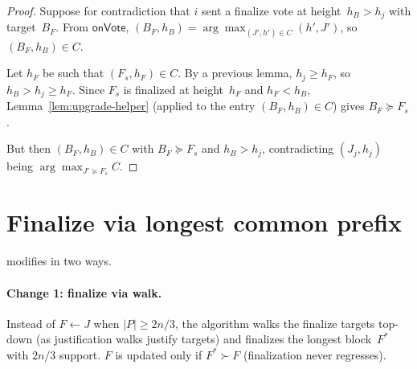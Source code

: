 \ifx\litemode\undefined\documentclass{article}\fi
\theoremstyle{plain}
\newtheorem{lemma}{Lemma}
\theoremstyle{definition}
\theoremstyle{remark}
\begin{document}
\begin{proof}
Suppose for contradiction that $i$ sent a finalize vote at height~$h_B > h_j$ with target~$B_F$.
From $\textsf{onVote}$, $(B_F, h_B) = \arg\max_{(J',h')\in C}(h', J')$, so $(B_F, h_B) \in C$.

Let $h_F$ be such that $(F_s, h_F) \in C$.
By a previous lemma, $h_j \geq h_F$, so $h_B > h_j \geq h_F$.
Since $F_s$ is finalized at height~$h_F$ and $h_F < h_B$, Lemma~\ref{lem:upgrade-helper} (applied to the entry $(B_F, h_B) \in C$) gives $B_F \succeq F_s$.

But then $(B_F, h_B) \in C$ with $B_F \succeq F_s$ and $h_B > h_j$, contradicting $(J_j, h_j)$ being $\arg\max_{J' \succeq F_s} C$.
\end{proof}





  

\section{Finalize via longest common prefix}

 modifies  in two ways.

\paragraph{Change 1: finalize via walk.}
Instead of $F \gets J$ when $|P| \geq 2n/3$, the algorithm walks the finalize targets top-down (as justification walks justify targets) and finalizes the longest block~$F^*$ with $2n/3$ support.
$F$ is updated only if $F^* \succ F$ (finalization never regresses).
\end{document}
